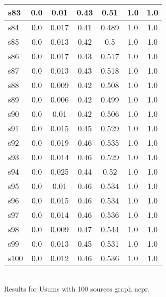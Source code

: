 \documentclass{article}
\begin{document}
\begin{tabular}{|l|c|c|c|c|c|c|}
s83 &0.0 & 0.01 & 0.43 & 0.51 & 1.0 & 1.0\\
\hline
s84 &0.0 & 0.017 & 0.41 & 0.489 & 1.0 & 1.0\\
\hline
s85 &0.0 & 0.013 & 0.42 & 0.5 & 1.0 & 1.0\\
\hline
s86 &0.0 & 0.017 & 0.43 & 0.517 & 1.0 & 1.0\\
\hline
s87 &0.0 & 0.013 & 0.43 & 0.518 & 1.0 & 1.0\\
\hline
s88 &0.0 & 0.009 & 0.42 & 0.508 & 1.0 & 1.0\\
\hline
s89 &0.0 & 0.006 & 0.42 & 0.499 & 1.0 & 1.0\\
\hline
s90 &0.0 & 0.01 & 0.42 & 0.506 & 1.0 & 1.0\\
\hline
s91 &0.0 & 0.015 & 0.45 & 0.529 & 1.0 & 1.0\\
\hline
s92 &0.0 & 0.019 & 0.46 & 0.535 & 1.0 & 1.0\\
\hline
s93 &0.0 & 0.014 & 0.46 & 0.529 & 1.0 & 1.0\\
\hline
s94 &0.0 & 0.025 & 0.44 & 0.52 & 1.0 & 1.0\\
\hline
s95 &0.0 & 0.01 & 0.46 & 0.534 & 1.0 & 1.0\\
\hline
s96 &0.0 & 0.015 & 0.46 & 0.534 & 1.0 & 1.0\\
\hline
s97 &0.0 & 0.014 & 0.46 & 0.536 & 1.0 & 1.0\\
\hline
s98 &0.0 & 0.009 & 0.47 & 0.544 & 1.0 & 1.0\\
\hline
s99 &0.0 & 0.013 & 0.45 & 0.531 & 1.0 & 1.0\\
\hline
s100 &0.0 & 0.012 & 0.46 & 0.536 & 1.0 & 1.0\\
\hline
\end{tabular}\\

\noindent Results for Usums with 100 sources graph ncpr.
\end{document}
